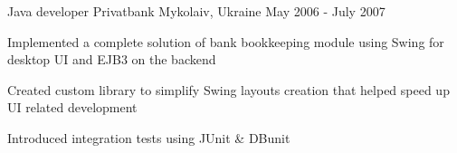 \begin{cventries}
  \cventry
    {Java developer} %
    {Privatbank} %
    {Mykolaiv, Ukraine} %
    {May 2006 - July 2007} %
    {
      \begin{cvitems} %
        \item {Implemented a complete solution of bank bookkeeping module using Swing for desktop UI and EJB3 on the backend}
        \item {Created custom library to simplify Swing layouts creation that helped speed up UI related development}
        \item {Introduced integration tests using JUnit \& DBunit}
      \end{cvitems}
    }
\end{cventries}
